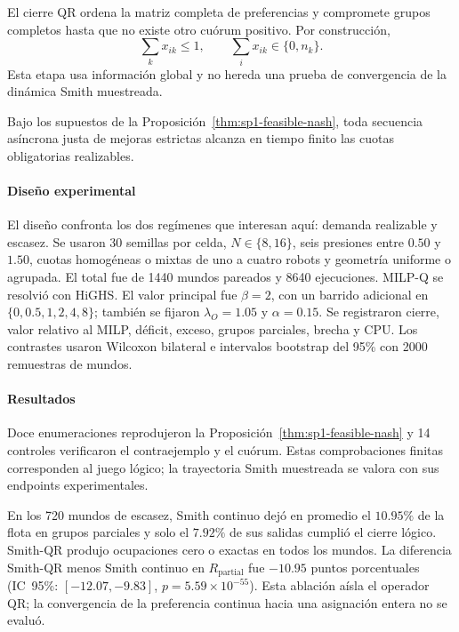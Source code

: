 El cierre QR ordena la matriz completa de preferencias y compromete grupos completos hasta que no existe otro cuórum positivo. Por construcción,
\begin{equation}
 \sum_kx_{ik}\leq1,\qquad \sum_ix_{ik}\in\{0,n_k\}.
 \label{eq:sp1-qr-invariants}
\end{equation}
Esta etapa usa información global y no hereda una prueba de convergencia de la dinámica Smith muestreada.

\begin{corolario}
\label{cor:sp1-strategic-regulation}
Bajo los supuestos de la Proposición~\ref{thm:sp1-feasible-nash}, toda secuencia asíncrona justa de mejoras estrictas alcanza en tiempo finito las cuotas obligatorias realizables.
\end{corolario}
\paragraph{Diseño experimental}

El diseño confronta los dos regímenes que interesan aquí: demanda realizable y escasez. Se usaron 30 semillas por celda, $N\in\{8, 16\}$, seis presiones entre $0.50$ y $1.50$, cuotas homogéneas o mixtas de uno a cuatro robots y geometría uniforme o agrupada. El total fue de 1440 mundos pareados y 8640 ejecuciones. MILP-Q se resolvió con HiGHS. El valor principal fue $\beta=2$, con un barrido adicional en $\{0,0.5,1,2,4,8\}$; también se fijaron $\lambda_O=1.05$ y $\alpha=0.15$. Se registraron cierre, valor relativo al MILP, déficit, exceso, grupos parciales, brecha y CPU. Los contrastes usaron Wilcoxon bilateral e intervalos \mbox{bootstrap} del 95\% con 2000 remuestras de mundos.

\paragraph{Resultados}

Doce enumeraciones reprodujeron la Proposición~\ref{thm:sp1-feasible-nash} y 14 controles verificaron el contraejemplo y el cuórum. Estas comprobaciones finitas corresponden al juego lógico; la trayectoria Smith muestreada se valora con sus endpoints experimentales.

En los 720 mundos de escasez, Smith continuo dejó en promedio el \(10.95\%\) de la flota en grupos parciales y solo el \(7.92\%\) de sus salidas cumplió el cierre lógico. Smith-QR produjo ocupaciones cero o exactas en todos los mundos. La diferencia Smith-QR menos Smith continuo en \(R_{\mathrm{partial}}\) fue \(-10.95\) puntos porcentuales (IC~95\%: \([-12.07,-9.83]\), \(p=5.59\times10^{-55}\)). Esta ablación aísla el operador QR; la convergencia de la preferencia continua hacia una asignación entera no se evaluó.

